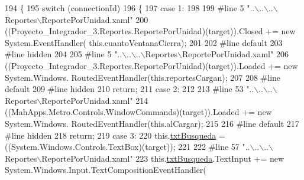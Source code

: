 \begin{DoxyCode}
194                                                                                                 \{
195             \textcolor{keywordflow}{switch} (connectionId)
196             \{
197             \textcolor{keywordflow}{case} 1:
198             
199 \textcolor{preprocessor}{            #line 5 "..\(\backslash\)..\(\backslash\)..\(\backslash\)Reportes\(\backslash\)ReportePorUnidad.xaml"}
200 \textcolor{preprocessor}{}            ((Proyecto\_Integrador\_3.Reportes.ReportePorUnidad)(target)).Closed += \textcolor{keyword}{new} System.EventHandler(\textcolor{keyword}{
      this}.cuantoVentanaCierra);
201             
202 \textcolor{preprocessor}{            #line default}
203 \textcolor{preprocessor}{}\textcolor{preprocessor}{            #line hidden}
204 \textcolor{preprocessor}{}            
205 \textcolor{preprocessor}{            #line 5 "..\(\backslash\)..\(\backslash\)..\(\backslash\)Reportes\(\backslash\)ReportePorUnidad.xaml"}
206 \textcolor{preprocessor}{}            ((Proyecto\_Integrador\_3.Reportes.ReportePorUnidad)(target)).Loaded += \textcolor{keyword}{new} System.Windows.
      RoutedEventHandler(\textcolor{keyword}{this}.reportesCargan);
207             
208 \textcolor{preprocessor}{            #line default}
209 \textcolor{preprocessor}{}\textcolor{preprocessor}{            #line hidden}
210 \textcolor{preprocessor}{}            \textcolor{keywordflow}{return};
211             \textcolor{keywordflow}{case} 2:
212             
213 \textcolor{preprocessor}{            #line 53 "..\(\backslash\)..\(\backslash\)..\(\backslash\)Reportes\(\backslash\)ReportePorUnidad.xaml"}
214 \textcolor{preprocessor}{}            ((MahApps.Metro.Controls.WindowCommands)(target)).Loaded += \textcolor{keyword}{new} System.Windows.
      RoutedEventHandler(\textcolor{keyword}{this}.alCargar);
215             
216 \textcolor{preprocessor}{            #line default}
217 \textcolor{preprocessor}{}\textcolor{preprocessor}{            #line hidden}
218 \textcolor{preprocessor}{}            \textcolor{keywordflow}{return};
219             \textcolor{keywordflow}{case} 3:
220             this.\hyperlink{class_proyecto___integrador__3_1_1_reportes_1_1_reporte_por_unidad_a0a6db8ee110ce078b4507f464c026fda}{txtBusqueda} = ((System.Windows.Controls.TextBox)(target));
221             
222 \textcolor{preprocessor}{            #line 57 "..\(\backslash\)..\(\backslash\)..\(\backslash\)Reportes\(\backslash\)ReportePorUnidad.xaml"}
223 \textcolor{preprocessor}{}            this.\hyperlink{class_proyecto___integrador__3_1_1_reportes_1_1_reporte_por_unidad_a0a6db8ee110ce078b4507f464c026fda}{txtBusqueda}.TextInput += \textcolor{keyword}{new} System.Windows.Input.TextCompositionEventHandler(

\end{DoxyCode}
